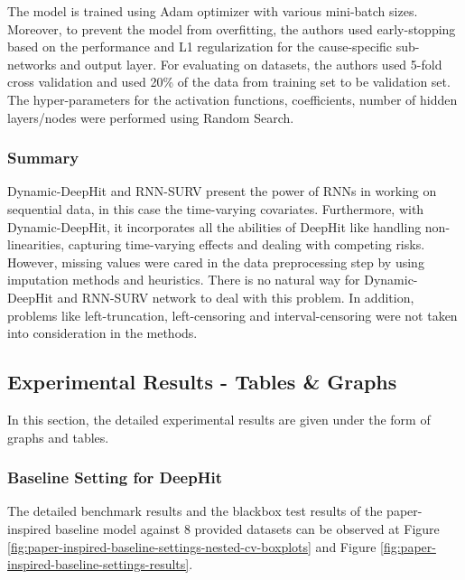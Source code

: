 \documentclass[
]{article}
\begin{document}
The model is trained using Adam optimizer with various mini-batch sizes. Moreover, to prevent the model from overfitting, the authors used early-stopping based on the performance and L1 regularization for the cause-specific sub-networks and output layer. For evaluating on datasets, the authors used 5-fold cross validation and used 20\% of the data from training set to be validation set. The hyper-parameters for the activation functions, coefficients, number of hidden layers/nodes were performed using Random Search.

\hypertarget{summary-1}{%
\subsubsection{Summary}\label{summary-1}}

Dynamic-DeepHit and RNN-SURV present the power of RNNs in working on sequential data, in this case the time-varying covariates. Furthermore, with Dynamic-DeepHit, it incorporates all the abilities of DeepHit like handling non-linearities, capturing time-varying effects and dealing with competing risks.\\
However, missing values were cared in the data preprocessing step by using imputation methods and heuristics. There is no natural way for Dynamic-DeepHit and RNN-SURV network to deal with this problem. In addition, problems like left-truncation, left-censoring and interval-censoring were not taken into consideration in the methods.

\hypertarget{experimental-results---tables-graphs}{%
\subsection{Experimental Results - Tables \& Graphs}\label{experimental-results---tables-graphs}}

In this section, the detailed experimental results are given under the form of graphs and tables.

\hypertarget{base}{%
\subsubsection{Baseline Setting for DeepHit}\label{base}}

The detailed benchmark results and the blackbox test results of the paper-inspired baseline model against 8 provided datasets can be observed at Figure \ref{fig:paper-inspired-baseline-settings-nested-cv-boxplots} and Figure \ref{fig:paper-inspired-baseline-settings-results}.
\end{document}
